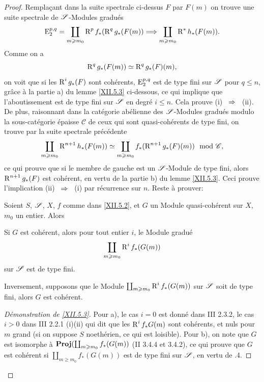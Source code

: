 \begin{proof}
Rempla\c cant dans la suite spectrale ci-dessus $F$ par $F(m)$ on
trouve une suite spectrale de ${\mathscr S}$-Modules gradu\'es
\[
\E_2^{p, q}= \coprod_{m\geq m_0} \R^pf_\ast(\R^qg_\ast(F(m)) \To \coprod_{m\geq m_0} \R^\ast h_\ast(F(m)).
\]
Comme on a
\[
\operatorname{R}^qg_\ast(F(m)) \simeq \operatorname{R}^qg_\ast(F) (m),
\]
on voit que si les $\operatorname{R}^ig_\ast(F)$ sont coh\'erents, $\operatorname{E}_2^{p, q}$ est de type fini sur ${\mathscr S}$ pour $q\leq n$, gr\^ace \`a la partie a) du lemme \ref{XII.5.3} ci-dessous, ce qui implique que l'aboutissement est de type fini sur ${\mathscr S}$ en degr\'e $i\leq n$. Cela prouve (i) ~$\To$~ (ii). De plus, raisonnant dans la cat\'egorie ab\'elienne des ${\mathscr S}$-Modules gradu\'es modulo la sous-cat\'egorie \'epaisse $\mathcal{C}$ de ceux qui sont quasi-coh\'erents de type fini, on trouve par la suite spectrale pr\'ec\'edente
\[
\coprod_{m\geqslant m_0} \operatorname{R}^{n+1} h_\ast(F(m)) \simeq \coprod_{m\geqslant m_0} f_\ast (\operatorname{R}^{n+1} g_\ast(F)(m)) \mod {\mathscr}{C},
\]
ce qui prouve que si le membre de gauche est un ${\mathscr S}$-Module de type fini, alors $\operatorname{R}^{n+1} g_\ast(F)$ est coh\'erent, en vertu de la partie b) du lemme \ref{XII.5.3}. Ceci prouve l'implication (ii) ~$\To$~ (i) par r\'ecurrence sur $n$. Reste \`a prouver:

\begin{lemme} \label{XII.5.3} Soient $S$, ${\mathscr S}$, $X$, $f$ comme dans \ref{XII.5.2}, et $G$ un Module quasi-coh\'erent sur $X$, $m_0$ un entier. Alors
\begin{enumeratea}
\item
Si $G$ est coh\'erent, alors pour tout entier $i$, le Module gradu\'e
\[
\coprod_{m\geqslant m_0} \operatorname{R}^i f_\ast(G(m))
\]
sur ${\mathscr S}$ est de type fini.
\item
Inversement, supposons que le Module $\coprod_{m\geqslant m_0} \operatorname{R}^i f_\ast(G(m))$ sur ${\mathscr S}$ soit de type fini, alors $G$ est coh\'erent.
\end{enumeratea}
\end{lemme}

\begin{proof}[D\'emonstration de \ref{XII.5.3}]
Pour a), le cas $i=0$ est donn\'e dans \EGA III 2.3.2, le cas $i>0$ dans \EGA III 2.2.1 (i)(ii) qui dit que les $ \operatorname{R}^i f_\ast G(m)$ sont coh\'erents, et nuls pour $m$ grand (si on suppose $S$ noeth\'erien, ce qui est loisible). Pour b), on note que $G$ est isomorphe \`a $\operatorname{\mathbf{Proj}} (\coprod_{m\geqslant m_0}f_\ast(G(m))$ (\EGA II 3.4.4 et 3.4.2), ce qui prouve que $G$ est coh\'erent si $\coprod_{m\geq m_0}f_\ast(G(m))$ est de type fini sur ${\mathscr S}$, en vertu de .4.
\skipqed
\end{proof}
\skipqed
\end{proof}

